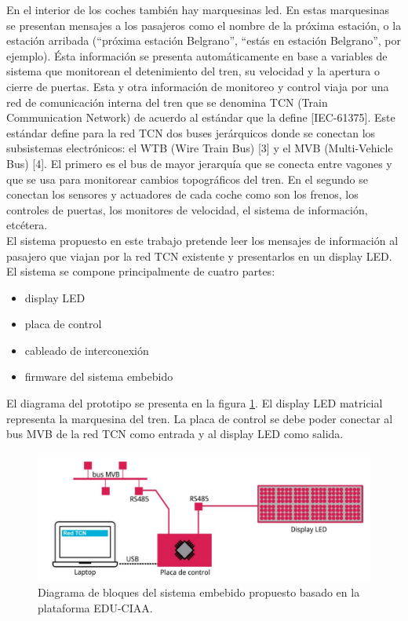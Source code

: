 En el interior de los coches también hay marquesinas led. En estas marquesinas se presentan
mensajes a los pasajeros como el nombre de la próxima estación, o la estación arribada
(“próxima estación Belgrano”, “estás en estación Belgrano”, por ejemplo). Ésta información se
presenta automáticamente en base a variables de sistema que monitorean el detenimiento del
tren, su velocidad y la apertura o cierre de puertas. Esta y otra información de monitoreo y control viaja por una red de comunicación interna del tren que se denomina TCN (Train Communication Network) de acuerdo al estándar que la define [IEC-61375]. Este estándar define para la red TCN dos buses jerárquicos donde se conectan los subsistemas electrónicos: el WTB (Wire Train Bus) [3] y el MVB (Multi-Vehicle Bus) [4]. El primero es el bus de mayor jerarquía que se conecta entre vagones y que se usa para monitorear cambios topográficos del tren. En el
segundo se conectan los sensores y actuadores de cada coche como son los frenos, los controles de puertas, los monitores de velocidad, el sistema de información, etcétera.\\

 El sistema propuesto en este trabajo pretende leer los mensajes de información al pasajero que viajan por la red TCN existente y presentarlos en un display LED. El sistema se compone principalmente de cuatro partes:
 \begin{itemize}
\item display LED
\item placa de control
\item cableado de interconexión
\item firmware del sistema embebido
 \end{itemize}

El diagrama del prototipo se presenta en la figura \ref{fig:diagramaPIDSCIAA}. El display LED matricial representa la marquesina del tren. La placa de control se debe poder conectar al bus MVB de la red TCN como entrada y al display LED como salida.

\begin{figure}[ht]
	\centering
	\includegraphics[width=1\textwidth]{./Figures/diagramaPIDSCIAA.png}
	\caption{Diagrama de bloques del sistema embebido propuesto basado en la plataforma EDU-CIAA.}
	\label{fig:diagramaPIDSCIAA}
\end{figure}


